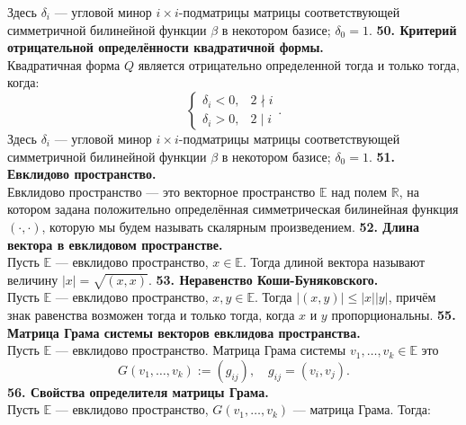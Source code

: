 \documentclass{article}
\begin{document}
Здесь $\delta_i$ --- угловой минор $i\times i$-подматрицы матрицы соответствующей симметричной билинейной функции $\beta$ в некотором базисе; $\delta_0 = 1$.
\newline
\newline
\textbf{50. Критерий отрицательной определённости квадратичной формы.}\\
Квадратичная форма $Q$ является отрицательно определенной тогда и только тогда,\\ когда:
$$
\begin{cases}
	\delta_i < 0, & 2 \nmid i \\
	\delta_i > 0, & 2 \mid i
\end{cases}.
$$
Здесь $\delta_i$ --- угловой минор $i\times i$-подматрицы матрицы соответствующей симметричной билинейной функции $\beta$ в некотором базисе; $\delta_0 = 1$.
\newline
\newline
\textbf{51. Евклидово пространство.}\\
Евклидово пространство --- это векторное пространство $\mathbb{E}$ над полем $\mathbb{R}$, на котором задана положительно определённая симметрическая билинейная функция $(\cdot, \cdot)$, которую мы будем называть скалярным произведением.
\newline
\newline
\textbf{52. Длина вектора в евклидовом пространстве.}\\
Пусть $\mathbb{E}$ --- евклидово пространство, $x\in \mathbb{E}$. Тогда длиной вектора называют величину $|x| = \sqrt{(x,x)}$.
\newline
\newline
\textbf{53. Неравенство Коши-Буняковского.}\\
Пусть $\mathbb{E}$ --- евклидово пространство, $x, y \in \mathbb{E}$. Тогда $|(x,y)| \leqslant |x||y|$, причём знак равенства возможен тогда и только тогда, когда $x$ и $y$ пропорциональны.
\newline
\newline
\textbf{55. Матрица Грама системы векторов евклидова пространства.}\\
Пусть $\mathbb{E}$ --- евклидово пространство.
Матрица Грама системы $v_1, \ldots, v_k \in \mathbb{E}$ это
	$$G(v_1,\ldots, v_k) := (g_{ij}),\quad g_{ij} = (v_i,v_j).$$
\newline
\newline
\textbf{56. Свойства определителя матрицы Грама.}\\
Пусть $\mathbb{E}$ --- евклидово пространство, $G(v_1,\ldots, v_k)$ --- матрица Грама. Тогда:
\end{document}

